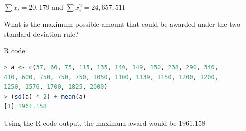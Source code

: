     $\sum x_i = 20,179$ and $\sum x_{i}^{2} = 24,657,511$

    What is the maximum possible amount that could be awarded under the two-standard deviation rule?

    \begin{mdframed}
        R code:

        \begin{lstlisting}[language=R]
> a <- c(37, 60, 75, 115, 135, 140, 149, 150, 238, 290, 340, 
410, 600, 750, 750, 750, 1050, 1100, 1139, 1150, 1200, 1200, 
1250, 1576, 1700, 1825, 2000)
> (sd(a) * 2) + mean(a)
[1] 1961.158
        \end{lstlisting}
        Using the R code output, the maximum award would be $\boxed{\text{1961.158}}$
    \end{mdframed}
